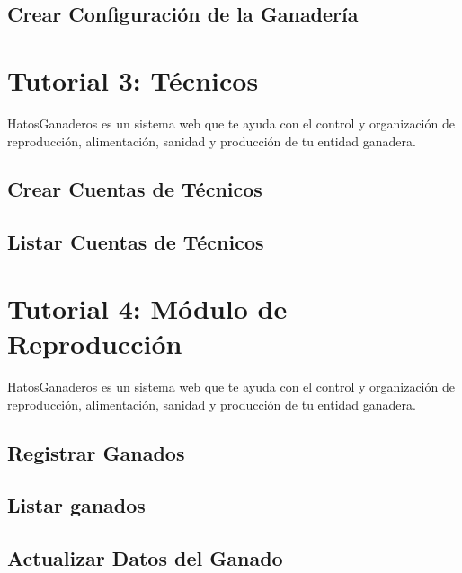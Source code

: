 \documentclass[letterpaper,10pt,spanish]{sphinxmanual}
\begin{document}
\subsection{Crear Configuración de la Ganadería}
\label{Tutorial 2: Configuraci_xf3n:crear-configuracion-de-la-ganaderia}

\section{Tutorial 3: Técnicos}
\label{Tutorial 3: T_xe9cnicos:tutorial-3-tecnicos}\label{Tutorial 3: T_xe9cnicos::doc}
HatosGanaderos es un sistema web que te ayuda con el control y organización de reproducción, alimentación, sanidad y producción de tu entidad ganadera.


\subsection{Crear Cuentas de Técnicos}
\label{Tutorial 3: T_xe9cnicos:crear-cuentas-de-tecnicos}

\subsection{Listar Cuentas de Técnicos}
\label{Tutorial 3: T_xe9cnicos:listar-cuentas-de-tecnicos}

\section{Tutorial 4: Módulo de Reproducción}
\label{Tutorial 4: M_xf3dulo de Reproducci_xf3n::doc}\label{Tutorial 4: M_xf3dulo de Reproducci_xf3n:tutorial-4-modulo-de-reproduccion}
HatosGanaderos es un sistema web que te ayuda con el control y organización de reproducción, alimentación, sanidad y producción de tu entidad ganadera.


\subsection{Registrar Ganados}
\label{Tutorial 4: M_xf3dulo de Reproducci_xf3n:registrar-ganados}

\subsection{Listar ganados}
\label{Tutorial 4: M_xf3dulo de Reproducci_xf3n:listar-ganados}

\subsection{Actualizar Datos del Ganado}
\label{Tutorial 4: M_xf3dulo de Reproducci_xf3n:actualizar-datos-del-ganado}
\end{document}
